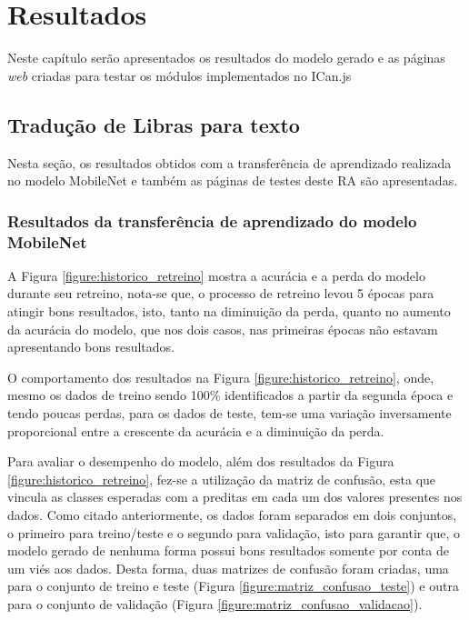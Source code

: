 \newpage
\chapter{Resultados}

\par Neste capítulo serão apresentados os resultados do modelo gerado e as páginas \textit{web} criadas para testar os módulos implementados no ICan.js

\section{Tradução de Libras para texto}

\par Nesta seção, os resultados obtidos com a transferência de aprendizado realizada no modelo MobileNet e também as páginas de testes deste RA são apresentadas.

\subsection{Resultados da transferência de aprendizado do modelo MobileNet}


\par A Figura \ref{figure:historico_retreino} mostra a acurácia e a perda do modelo durante seu retreino, nota-se que, o processo de retreino levou 5 épocas para atingir bons resultados, isto, tanto na diminuição da perda, quanto no aumento da acurácia do modelo, que nos dois casos, nas primeiras épocas não estavam apresentando bons resultados.

\par O comportamento dos resultados na Figura \ref{figure:historico_retreino}, onde, mesmo os dados de treino sendo 100\% identificados a partir da segunda época e tendo poucas perdas, para os dados de teste, tem-se uma variação inversamente proporcional entre a crescente da acurácia e a diminuição da perda. 

\par Para avaliar o desempenho do modelo, além dos resultados da Figura \ref{figure:historico_retreino}, fez-se a utilização da matriz de confusão, esta que vincula as classes esperadas com a preditas em cada um dos valores presentes nos dados. Como citado anteriormente, os dados foram separados em dois conjuntos, o primeiro para treino/teste e o segundo para validação, isto para garantir que, o modelo gerado de nenhuma forma possui bons resultados somente por conta de um viés aos dados. Desta forma, duas matrizes de confusão foram criadas, uma para o conjunto de treino e teste (Figura \ref{figure:matriz_confusao_teste}) e outra para o conjunto de validação (Figura \ref{figure:matriz_confusao_validacao}).

